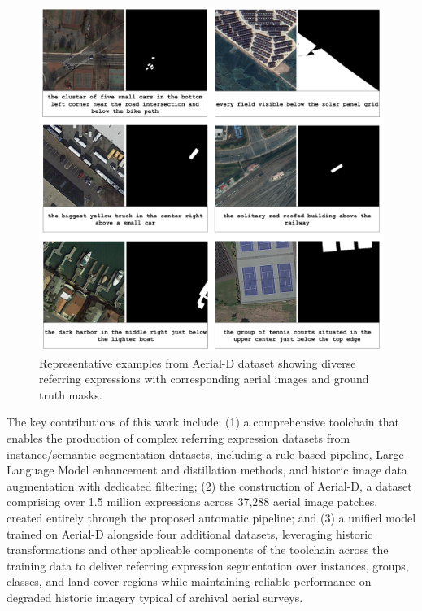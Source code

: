 \documentclass[journal]{IEEEtran}
\begin{document}
\begingroup
\setlength{\intextsep}{6pt}
\setlength{\abovecaptionskip}{2pt}
\setlength{\belowcaptionskip}{0pt}
\begin{figure}[H]
\centering
\includegraphics[width=\columnwidth]{./images/6samples.png}
\caption{Representative examples from Aerial-D dataset showing diverse referring expressions with corresponding aerial images and ground truth masks.}
\label{fig:dataset_examples}
\end{figure}
\endgroup


The key contributions of this work include: (1) a comprehensive toolchain that enables the production of complex referring expression datasets from instance/semantic segmentation datasets, including a rule-based pipeline, Large Language Model enhancement and distillation methods, and historic image data augmentation with dedicated filtering; (2) the construction of Aerial-D, a dataset comprising over 1.5 million expressions across 37,288 aerial image patches, created entirely through the proposed automatic pipeline; and (3) a unified model trained on Aerial-D alongside four additional datasets, leveraging historic transformations and other applicable components of the toolchain across the training data to deliver referring expression segmentation over instances, groups, classes, and land-cover regions while maintaining reliable performance on degraded historic imagery typical of archival aerial surveys.
\end{document}
